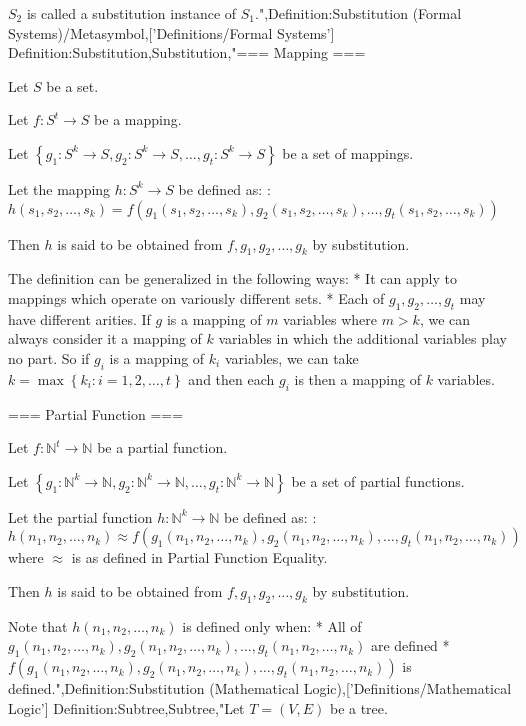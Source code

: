 $S_2$ is called a substitution instance of $S_1$.",Definition:Substitution (Formal Systems)/Metasymbol,['Definitions/Formal Systems']
Definition:Substitution,Substitution,"=== Mapping ===

Let $S$ be a set.

Let $f: S^t \to S$ be a mapping.

Let $\left\{{g_1: S^k \to S, g_2: S^k \to S, \ldots, g_t: S^k \to S}\right\}$ be a set of mappings.

Let the mapping $h: S^k \to S$ be defined as:
:$h \left({s_1, s_2, \ldots, s_k}\right) = f \left({g_1 \left({s_1, s_2, \ldots, s_k}\right), g_2 \left({s_1, s_2, \ldots, s_k}\right), \ldots, g_t \left({s_1, s_2, \ldots, s_k}\right)}\right)$


Then $h$ is said to be obtained from $f, g_1, g_2, \ldots, g_k$ by substitution.


The definition can be generalized in the following ways:
* It can apply to mappings which operate on variously different sets.
* Each of $g_1, g_2, \ldots, g_t$ may have different arities. If $g$ is a mapping of $m$ variables where $m > k$, we can always consider it a mapping of $k$ variables in which the additional variables play no part. So if $g_i$ is a mapping of $k_i$ variables, we can take $k = \max \left\{{k_i: i = 1, 2, \ldots, t}\right\}$ and then each $g_i$ is then a mapping of $k$ variables.


=== Partial Function ===

Let $f: \mathbb N^t \to \mathbb N$ be a partial function.

Let $\left\{{g_1: \mathbb N^k \to \mathbb N, g_2: \mathbb N^k \to \mathbb N, \ldots, g_t: \mathbb N^k \to \mathbb N}\right\}$ be a set of partial functions.

Let the partial function $h: \mathbb N^k \to \mathbb N$ be defined as:
:$h \left({n_1, n_2, \ldots, n_k}\right) \approx f \left({g_1 \left({n_1, n_2, \ldots, n_k}\right), g_2 \left({n_1, n_2, \ldots, n_k}\right), \ldots, g_t \left({n_1, n_2, \ldots, n_k}\right)}\right)$
where $\approx$ is as defined in Partial Function Equality.


Then $h$ is said to be obtained from $f, g_1, g_2, \ldots, g_k$ by substitution.


Note that $h \left({n_1, n_2, \ldots, n_k}\right)$ is defined only when:
* All of $g_1 \left({n_1, n_2, \ldots, n_k}\right), g_2 \left({n_1, n_2, \ldots, n_k}\right), \ldots, g_t \left({n_1, n_2, \ldots, n_k}\right)$ are defined
* $f \left({g_1 \left({n_1, n_2, \ldots, n_k}\right), g_2 \left({n_1, n_2, \ldots, n_k}\right), \ldots, g_t \left({n_1, n_2, \ldots, n_k}\right)}\right)$ is defined.",Definition:Substitution (Mathematical Logic),['Definitions/Mathematical Logic']
Definition:Subtree,Subtree,"Let $T = \left( V, E \right)$ be a tree.


